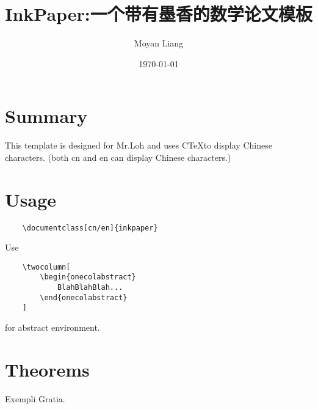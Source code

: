 \documentclass[en]{inkpaper}
\title{InkPaper:一个带有墨香的数学论文模板}
\author{Moyan Liang}
\date{\today}
\begin{document}
\twocolumn[
    \maketitle
]
\section{Summary}
This template is designed for Mr.Loh and uses C\TeX to display Chinese characters.
(both cn and en can display Chinese characters.)
\section{Usage}
\begin{lstlisting}
    \documentclass[cn/en]{inkpaper}
\end{lstlisting}
Use
\begin{lstlisting}
    \twocolumn[
        \begin{onecolabstract}
            BlahBlahBlah...
        \end{onecolabstract}
    ]
\end{lstlisting}
for abstract environment.
\section{Theorems}
\begin{theorem}
    Exempli Gratia.
\end{theorem}
\end{document}
